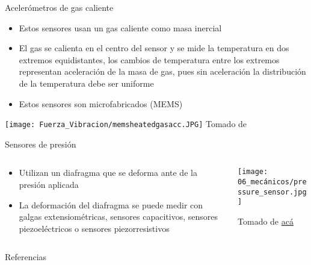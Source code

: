 \documentclass[aspectratio=169]{beamer}
\begin{document}
\begin{frame}{Acelerómetros de gas caliente}
            \begin{itemize}
                \item Estos sensores usan un gas caliente como masa inercial
                \item El gas se calienta en el centro del sensor y se mide la temperatura en dos extremos equidistantes, los cambios de temperatura entre los extremos representan aceleración de la masa de gas, pues sin aceleración la distribución de la temperatura debe ser uniforme
                \item Estos sensores son microfabricados (MEMS)
            \end{itemize}
            \centering
            \texttt{[image: Fuerza\_Vibracion/memsheatedgasacc.JPG]}
            \tiny{Tomado de \cite{Fraden_2016}}
\end{frame}

\begin{frame}{Sensores de presión}
    \begin{columns}[c, onlytextwidth]
        \begin{column}{0.6\textwidth}
            \begin{itemize}
                \item Utilizan un diafragma que se deforma ante de la presión aplicada
                \item La deformación del diafragma se puede medir con galgas extensiométricas, sensores capacitivos, sensores piezoeléctricos o sensores piezorresistivos
            \end{itemize}
        \end{column}
        \begin{column}{0.4\textwidth}
            \centering
            \texttt{[image: 06\_mecánicos/pressure\_sensor.jpg]}

            \tiny{Tomado de \href{https://www.processindustryforum.com/article/tips-effective-maintenance-pressure-sensors}{acá}}
        \end{column}
    \end{columns}
\end{frame}

\begin{frame}{Referencias}
\footnotesize
\printbibliography[heading=none]
\end{frame}
\end{document}
